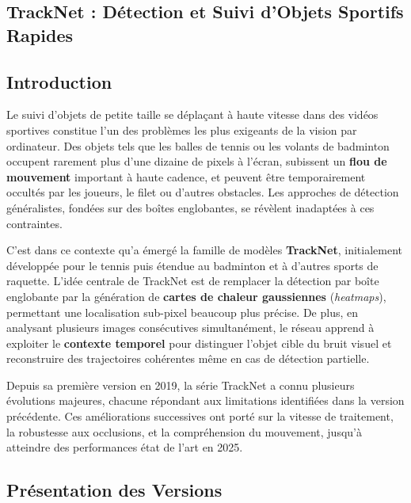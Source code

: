\begin{itemize}
\section{TrackNet : Détection et Suivi d'Objets Sportifs Rapides}

\subsection{Introduction}

Le suivi d'objets de petite taille se déplaçant à haute vitesse dans des vidéos
sportives constitue l'un des problèmes les plus exigeants de la vision par
ordinateur. Des objets tels que les balles de tennis ou les volants de badminton
occupent rarement plus d'une dizaine de pixels à l'écran, subissent un
\textbf{flou de mouvement} important à haute cadence, et peuvent être
temporairement occultés par les joueurs, le filet ou d'autres obstacles. Les
approches de détection généralistes, fondées sur des boîtes englobantes, se
révèlent inadaptées à ces contraintes.

C'est dans ce contexte qu'a émergé la famille de modèles \textbf{TrackNet},
initialement développée pour le tennis puis étendue au badminton et à d'autres
sports de raquette. L'idée centrale de TrackNet est de remplacer la détection par
boîte englobante par la génération de \textbf{cartes de chaleur gaussiennes}
(\textit{heatmaps}), permettant une localisation sub-pixel beaucoup plus précise.
De plus, en analysant plusieurs images consécutives simultanément, le réseau
apprend à exploiter le \textbf{contexte temporel} pour distinguer l'objet cible du
bruit visuel et reconstruire des trajectoires cohérentes même en cas de détection
partielle.

Depuis sa première version en 2019, la série TrackNet a connu plusieurs évolutions
majeures, chacune répondant aux limitations identifiées dans la version précédente.
Ces améliorations successives ont porté sur la vitesse de traitement, la robustesse
aux occlusions, et la compréhension du mouvement, jusqu'à atteindre des
performances état de l'art en 2025.

\subsection{Présentation des Versions}


\end{itemize}
